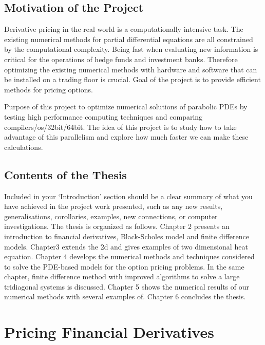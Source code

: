 \documentclass[12pt, oneside]{book}
\theoremstyle{plain}
\theoremstyle{definition}
\begin{document}
\section{Motivation of the Project}
Derivative pricing in the real world is a computationally intensive task. The existing numerical methods for partial differential equations are all constrained by the computational complexity. Being fast when evaluating new information is critical for the operations of hedge funds and investment banks. Therefore optimizing the existing numerical methods with hardware and software that can be installed on a trading floor is crucial. Goal of the project is to provide efficient methods for pricing options.

Purpose of this project to optimize numerical solutions of parabolic PDEs by testing high performance computing techniques and comparing compilers/os/32bit/64bit.
The idea of this project is to study how to take advantage of this parallelism and explore how much faster we can make these calculations.

\section{Contents of the Thesis}
Included in your ‘Introduction’ section should be a clear summary of  what  you  have  achieved  in  the  project  work  presented,  such  as  any  new  results, generalisations, corollaries, examples, new connections, or computer investigations.  The thesis is organized as follows.  Chapter 2 presents an introduction to financial derivatives, Black-Scholes model and finite difference models.  Chapter3 extends the 2d and gives examples of two dimensional heat equation.  Chapter 4 develops the numerical methods and techniques considered to solve the PDE-based models for the option pricing problems.  In the same chapter,  finite difference method with improved algorithms to solve a large tridiagonal systems is discussed.  Chapter 5 shows the numerical results of our numerical methods with several examples of.  Chapter 6 concludes the thesis.

\chapter{Pricing Financial Derivatives}\label{Pricing Financial Derivatives}
\end{document}
